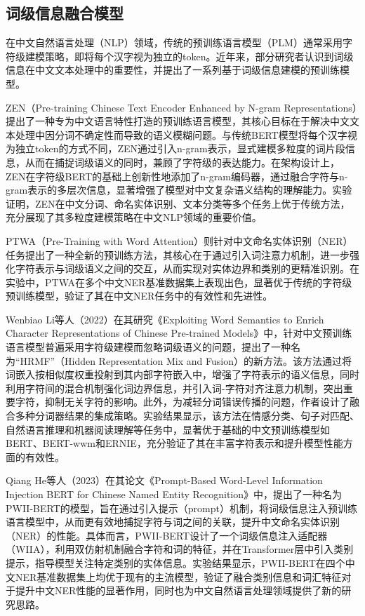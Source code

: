 \documentclass[12pt, a4paper]{ctexart}
\begin{document}
\subsection{词级信息融合模型}

在中文自然语言处理（NLP）领域，传统的预训练语言模型（PLM）通常采用字符级建模策略，即将每个汉字视为独立的token。近年来，部分研究者认识到词级信息在中文文本处理中的重要性，并提出了一系列基于词级信息建模的预训练模型。

ZEN（Pre-training Chinese Text Encoder Enhanced by N-gram Representations）提出了一种专为中文语言特性打造的预训练语言模型，其核心目标在于解决中文文本处理中因分词不确定性而导致的语义模糊问题\cite{diao-etal-2020-zen}。与传统BERT模型将每个汉字视为独立token的方式不同，ZEN通过引入n-gram表示，显式建模多粒度的词片段信息，从而在捕捉词级语义的同时，兼顾了字符级的表达能力。在架构设计上，ZEN在字符级BERT的基础上创新性地添加了n-gram编码器，通过融合字符与n-gram表示的多层次信息，显著增强了模型对中文复杂语义结构的理解能力。实验证明，ZEN在中文分词、命名实体识别、文本分类等多个任务上优于传统方法，充分展现了其多粒度建模策略在中文NLP领域的重要价值。

PTWA（Pre-Training with Word Attention）则针对中文命名实体识别（NER）任务提出了一种全新的预训练方法，其核心在于通过引入词注意力机制，进一步强化字符表示与词级语义之间的交互，从而实现对实体边界和类别的更精准识别\cite{Ma2021PTWAPW}。在实验中，PTWA在多个中文NER基准数据集上表现出色，显著优于传统的字符级预训练模型，验证了其在中文NER任务中的有效性和先进性。

Wenbiao Li等人（2022）在其研究《Exploiting Word Semantics to Enrich Character Representations of Chinese Pre-trained Models》中，针对中文预训练语言模型普遍采用字符级建模而忽略词级语义的问题，提出了一种名为“HRMF”（Hidden Representation Mix and Fusion）的新方法\cite{Li2022ExploitingWS}。该方法通过将词嵌入按相似度权重投射到其内部字符嵌入中，增强了字符表示的语义信息，同时利用字符间的混合机制强化词边界信息，并引入词-字符对齐注意力机制，突出重要字符，抑制无关字符的影响。此外，为减轻分词错误传播的问题，作者设计了融合多种分词器结果的集成策略。实验结果显示，该方法在情感分类、句子对匹配、自然语言推理和机器阅读理解等任务中，显著优于基础的中文预训练模型如BERT、BERT-wwm和ERNIE，充分验证了其在丰富字符表示和提升模型性能方面的有效性。

Qiang He等人（2023）在其论文《Prompt-Based Word-Level Information Injection BERT for Chinese Named Entity Recognition》中，提出了一种名为PWII-BERT的模型，旨在通过引入提示（prompt）机制，将词级信息注入预训练语言模型中，从而更有效地捕捉字符与词之间的关联，提升中文命名实体识别（NER）的性能\cite{He2023PromptBasedWI}。具体而言，PWII-BERT设计了一个词级信息注入适配器（WIIA），利用双仿射机制融合字符和词的特征，并在Transformer层中引入类别提示，指导模型关注特定类别的实体信息。实验结果显示，PWII-BERT在四个中文NER基准数据集上均优于现有的主流模型，验证了融合类别信息和词汇特征对于提升中文NER性能的显著作用，同时也为中文自然语言处理领域提供了新的研究思路。
\end{document}
